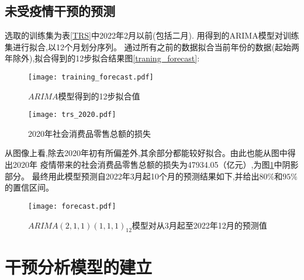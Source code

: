 \documentclass[12pt,a4paper]{nmmcm}
\begin{document}
  \subsection{未受疫情干预的预测}
  选取的训练集为表\ref{TRS}中2022年2月以前(包括二月).
  用得到的ARIMA模型对训练集进行拟合,以12个月划分序列。
  通过所有之前的数据拟合当前年份的数据(起始两年除外),拟合得到的12步拟合结果图\ref{traning_forecast}:
  \begin{figure}[H] %
    \centering %
    \begin{minipage}[t]{0.48\textwidth}
      \centering
      \texttt{[image: training\_forecast.pdf]} %
      \caption{\small{\(ARIMA\)模型得到的12步拟合值}} %
      \label{traning_forecast} %
    \end{minipage}
    \begin{minipage}[t]{0.48\textwidth}
      \centering %
      \texttt{[image: trs\_2020.pdf]} %
      \caption{\small{2020年社会消费品零售总额的损失}} %
      \label{trs_2020} %
    \end{minipage}
  \end{figure} 
  从图像上看,除去2020年初有所偏差外,其余部分都能较好拟合。由此也能从图中得出2020年
  疫情带来的社会消费品零售总额的损失为47934.05（亿元）,为图\ref{trs_2020}中阴影部分。
  最终用此模型预测自2022年3月起10个月的预测结果如下,并给出\(80\% \text{和}95\%\)的置信区间。
  \begin{figure}[H] %
    \centering %
    \texttt{[image: forecast.pdf]} %
    \caption{\(ARIMA(2,1,1)(1,1,1)_{12}\)模型对从3月起至2022年12月的预测值} %
    \label{forecast} %
  \end{figure} 
  \section{干预分析模型的建立}
\end{document}
